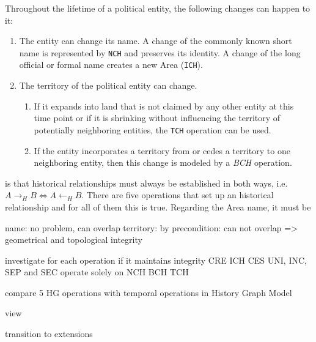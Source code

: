 Throughout the lifetime of a political entity, the following changes can happen to it:
\begin{enumerate}
  \item The entity can change its name. A change of the commonly known short name is represented by \texttt{NCH} and preserves its identity. A change of the long official or formal name creates a new Area (\texttt{ICH}).
  \item The territory of the political entity can change.
  \begin{enumerate}
    \item If it expands into land that is not claimed by any other entity at this time point or if it is shrinking without influencing the territory of potentially neighboring entities, the \texttt{TCH} operation can be used.
    \item If the entity incorporates a territory from or cedes a territory to one neighboring entity, then this change is modeled by a \emph{BCH} operation.
  \end{enumerate}
\end{enumerate}



is that historical relationships must always be established in both ways, i.e. $A \rightarrow_H B \Leftrightarrow A \leftarrow_H B $. There are five operations that set up an historical relationship and for all of them this is true. Regarding the Area name, it must be



name: no problem, can overlap
territory: by precondition: can not overlap
=> geometrical and topological integrity

investigate for each operation if it maintains integrity
CRE
ICH
CES
UNI, INC, SEP and SEC operate solely on
NCH
BCH
TCH


compare 5 HG operations with temporal operations in History Graph Model

view



\vspace{2em}

transition to extensions